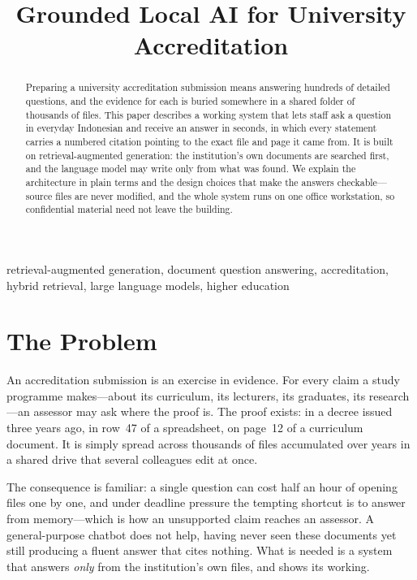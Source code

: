 \documentclass[conference]{IEEEtran}
\begin{document}
\title{Grounded Local AI for University Accreditation}

\author{
}

\maketitle

\begin{abstract}
Preparing a university accreditation submission means answering hundreds of
detailed questions, and the evidence for each is buried somewhere in a shared
folder of thousands of files. This paper describes a working system that lets
staff ask a question in everyday Indonesian and receive an answer in seconds, in
which every statement carries a numbered citation pointing to the exact file and
page it came from. It is built on retrieval-augmented generation: the
institution's own documents are searched first, and the language model may write
only from what was found. We explain the architecture in plain terms and the
design choices that make the answers checkable---source files are never
modified, and the whole system runs on one office workstation, so confidential
material need not leave the building.
\end{abstract}

\begin{IEEEkeywords}
retrieval-augmented generation, document question answering, accreditation,
hybrid retrieval, large language models, higher education
\end{IEEEkeywords}

\section{The Problem}

An accreditation submission is an exercise in evidence. For every claim a study
programme makes---about its curriculum, its lecturers, its graduates, its
research---an assessor may ask where the proof is. The proof exists: in a decree
issued three years ago, in row~47 of a spreadsheet, on page~12 of a curriculum
document. It is simply spread across thousands of files accumulated over years
in a shared drive that several colleagues edit at once.

The consequence is familiar: a single question can cost half an hour of opening
files one by one, and under deadline pressure the tempting shortcut is to answer
from memory---which is how an unsupported claim reaches an assessor. A
general-purpose chatbot does not help, having never seen these documents yet
still producing a fluent answer that cites nothing. What is needed is a system
that answers \emph{only} from the institution's own files, and shows its
working.
\end{document}
